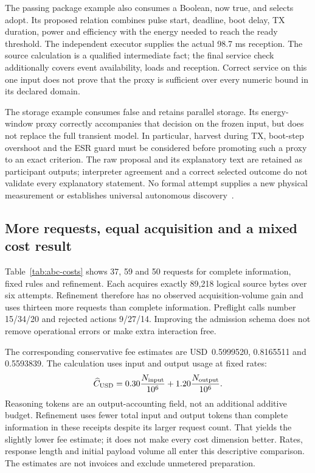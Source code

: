 The passing package example also consumes a Boolean, now true, and selects
adopt. Its proposed relation combines pulse start, deadline, boot delay, TX
duration, power and efficiency with the energy needed to reach the ready
threshold. The independent executor supplies the actual 98.7 ms reception.
The source calculation is a qualified intermediate fact; the final service
check additionally covers event availability, loads and reception. Correct
service on this one input does not prove that the proxy is sufficient over
every numeric bound in its declared domain.

The storage example consumes false and retains parallel storage. Its
energy-window proxy correctly accompanies that decision on the frozen input,
but does not replace the full transient model. In particular, harvest during
TX, boot-step overshoot and the ESR guard must be considered before promoting
such a proxy to an exact criterion. The raw proposal and its explanatory
text are retained as participant outputs; interpreter agreement and a correct
selected outcome do not validate every explanatory statement. No formal
attempt supplies a new physical measurement or establishes universal
autonomous discovery~\cite{abcb,abcaudit}.

\subsection{More requests, equal acquisition and a mixed cost result}
Table~\ref{tab:abc-costs} shows 37, 59 and 50 requests for complete information,
fixed rules and refinement. Each acquires exactly 89,218 logical source bytes
over six attempts. Refinement therefore has no observed acquisition-volume
gain and uses thirteen more requests than complete information. Preflight
calls number 15/34/20 and rejected actions 9/27/14. Improving the admission
schema does not remove operational errors or make extra interaction free.



The corresponding conservative fee estimates are USD~0.5999520, 0.8165511
and 0.5593839. The calculation uses input and output usage at fixed rates:
\begin{equation}
 \widehat C_{\rm USD}
 =0.30\frac{N_{\rm input}}{10^6}
  +1.20\frac{N_{\rm output}}{10^6}.
\end{equation}
Reasoning tokens are an output-accounting field, not an additional additive
budget. Refinement uses fewer total input and output tokens than complete
information in these receipts despite its larger request count. That yields
the slightly lower fee estimate; it does not make every cost dimension better.
Rates, response length and initial payload volume all enter this descriptive
comparison. The estimates are not invoices and exclude unmetered preparation.

